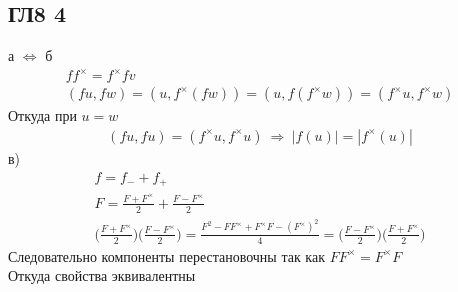 \subsection*{ГЛ8 4}
а $\Leftrightarrow$ б\\
\begin{gather*}
	ff^{\times} = f^{\times}fv\\
	(fu,fw) = (u, f^{\times}(fw)) = (u, f(f^{\times}w)) = (f^{\times}u, f^{\times}w)
\end{gather*}
Откуда при $u = w$
\begin{gather*}
	(fu, fu) = (f^{\times}u, f^{\times}u)\ \Rightarrow\ |f(u)| = |f^{\times}(u)|
\end{gather*}
в)
\begin{gather*}
	f = f_{-} + f_{+}\\
	F = \frac{F + F^{\times}}{2} + \frac{F - F^{\times}}{2}\\
	\Big(\frac{F + F^{\times}}{2}\Big) \Big(\frac{F - F^{\times}}{2}\Big) = \frac{F^{2} - FF^{\times} + F^{\times}F - (F^{\times})^{2}}{4} = \Big(\frac{F - F^{\times}}{2}\Big) \Big(\frac{F + F^{\times}}{2}\Big)
\end{gather*}
Следовательно компоненты перестановочны так как $FF^{\times} = F^{\times}F$\\
Откуда свойства эквивалентны
